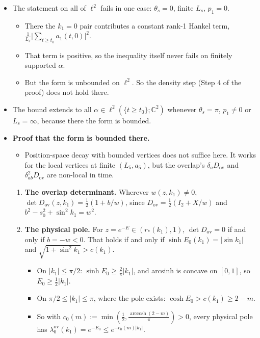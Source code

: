 \documentclass[11pt,a4paper]{article}
\begin{document}
\begin{itemize}
\item{} The statement on all of $\ell^2$ fails in one case: $\theta_s = 0$, finite $L_s$, $p_1 = 0$.
\begin{itemize}
\item{} There the $k_1 = 0$ pair contributes a constant rank-1 Hankel term, $\frac{1}{L_s}\big|\sum_{t \ge t_0} a_1(t, 0)\big|^2$.
\item{} That term is positive, so the inequality itself never fails on finitely supported $\alpha$.
\item{} But the form is unbounded on $\ell^2$. So the density step (Step 4 of the proof) does not hold there.
\end{itemize}

\item{} The bound extends to all $\alpha \in \ell^2(\{t \ge t_0\}; \mathbb{C}^2)$ whenever $\theta_s = \pi$, $p_1 \ne 0$ or $L_s = \infty$, because there the form is bounded.
\item{} {\bfseries\boldmath Proof that the form is bounded there.}
\begin{itemize}
\item{} Position-space decay with bounded vertices does not suffice here. It works for the local vertices at finite $(L_5, a_5)$, but the overlap's $\delta_a D_{\text{ov}}$ and $\delta^2_{ab} D_{\text{ov}}$ are non-local in time.
\end{itemize}

\begin{enumerate}
\item{} {\bfseries\boldmath The overlap determinant.} Wherever $w(z, k_1) \ne 0$, $\det D_{\text{ov}}(z, k_1) = \frac{1}{2}(1 + b/w)$, since $D_{\text{ov}} = \frac{1}{2}(I_2 + X/w)$ and $b^2 - s_0^2 + \sin^2 k_1 = w^2$.
\item{} {\bfseries\boldmath The physical pole.} For $z = e^{-E} \in (r_*(k_1), 1)$, $\det D_{\text{ov}} = 0$ if and only if $b = -w < 0$. That holds if and only if $\sinh E_0(k_1) = |\sin k_1|$ and $\sqrt{1 + \sin^2 k_1} > c(k_1)$.
\begin{itemize}
\item{} On $|k_1| \le \pi/2$: $\sinh E_0 \ge \frac{2}{\pi}|k_1|$, and arcsinh is concave on $[0, 1]$, so $E_0 \ge \frac{1}{2}|k_1|$.
\item{} On $\pi/2 \le |k_1| \le \pi$, where the pole exists: $\cosh E_0 > c(k_1) \ge 2 - m$.
\item{} So with $c_0(m) := \min(\frac{1}{2}, \frac{\operatorname{arccosh}(2 - m)}{\pi}) > 0$, every physical pole has $\lambda_0^{\text{ov}}(k_1) = e^{-E_0} \le e^{-c_0(m)|k_1|}$.
\end{itemize}


\end{enumerate}
\end{itemize}
\end{document}
